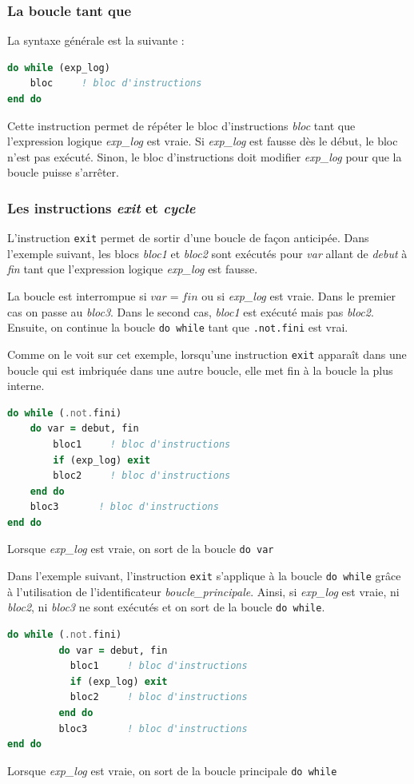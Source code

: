 \documentclass[a4paper,twoside]{article}
\begin{document}
\subsubsection{La boucle tant que}

La syntaxe générale est la suivante :
\begin{lstlisting}[language=Fortran]
do while (exp_log) 
    bloc     ! bloc d'instructions 
end do
\end{lstlisting}

Cette instruction permet de répéter le bloc d'instructions \emph{bloc} tant que l'expression logique \emph{exp\_log} est vraie. Si \emph{exp\_log} est fausse dès le début, le bloc n'est pas exécuté. Sinon, le bloc d'instructions doit modifier \emph{exp\_log} pour que la boucle puisse s'arrêter.

\subsubsection{Les instructions \emph{exit} et \emph{cycle}}

L'instruction \texttt{exit} permet de sortir d'une boucle de façon anticipée. Dans l'exemple suivant, les blocs \emph{bloc1} et \emph{bloc2} sont exécutés pour \emph{var} allant de \emph{debut} à \emph{fin} tant que l'expression logique \emph{exp\_log} est fausse. 

La boucle est interrompue si $var=fin$ ou si \emph{exp\_log} est vraie. Dans le premier cas on passe au \emph{bloc3}. Dans le second cas, \emph{bloc1} est exécuté mais pas \emph{bloc2}. Ensuite, on continue la boucle \texttt{do while} tant que \texttt{.not.fini} est vrai.

Comme on le voit sur cet exemple, lorsqu'une instruction \texttt{exit} appara\^{i}t dans une boucle qui est imbriquée dans une autre boucle, elle met fin à la boucle la plus interne.
\begin{lstlisting}[language=Fortran]
do while (.not.fini)
    do var = debut, fin 
        bloc1     ! bloc d'instructions 
        if (exp_log) exit
        bloc2     ! bloc d'instructions
    end do
    bloc3       ! bloc d'instructions
end do
\end{lstlisting}
Lorsque \emph{exp\_log} est vraie, on sort de la boucle \texttt{do var}


Dans l'exemple suivant, l'instruction \texttt{exit} s'applique à la boucle \texttt{do while} grâce à l'utilisation de l'identificateur \emph{boucle\_principale}. Ainsi, si \emph{exp\_log} est vraie, ni \emph{bloc2}, ni \emph{bloc3} ne sont exécutés et on sort de la boucle \texttt{do while}.
\begin{lstlisting}[language=Fortran]
do while (.not.fini)
         do var = debut, fin 
           bloc1     ! bloc d'instructions 
           if (exp_log) exit
           bloc2     ! bloc d'instructions
         end do
         bloc3       ! bloc d'instructions
end do
\end{lstlisting}
Lorsque \emph{exp\_log} est vraie, on sort de la boucle principale \texttt{do while}
\end{document}
